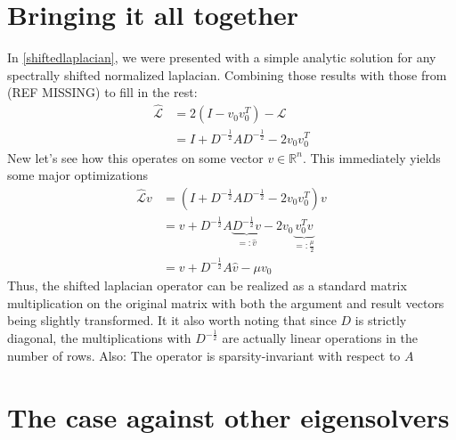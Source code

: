 \documentclass[10pt, a4paper, twocolumn]{article} %
\begin{document}
\section{Bringing it all together}
In \eqref{shiftedlaplacian}, we were presented with a simple analytic solution for any spectrally shifted normalized laplacian.
Combining those results with those from (REF MISSING) to fill in the rest:
\begin{equation}
	\begin{split}
		\hat{\mathcal{L}} & = 2 ( I - v_0 v_0^T ) - \mathcal{L}\\
		& = I + D^{-\frac{1}{2}} A D^{-\frac{1}{2}} - 2 v_0 v_0^T
	\end{split}
\end{equation}
New let's see how this operates on some vector $v \in \mathbb{R}^n$. This immediately yields some major optimizations
\begin{equation}
	\begin{split}
		\hat{\mathcal{L}}v & = \left( I + D^{-\frac{1}{2}} A D^{-\frac{1}{2}} - 2 v_0 v_0^T\right) v\\
		& = v + D^{-\frac{1}{2}} A \underbrace{D^{-\frac{1}{2}} v}_{=:\hat{v}} - 2 v_0 \underbrace{v_0^T v}_{=:\frac{\mu}{2}}\\
		& = v + D^{-\frac{1}{2}} A \hat{v} - \mu v_0
	\end{split}
\end{equation}
Thus, the shifted laplacian operator can be realized as a standard matrix multiplication on the original matrix with both the
argument and result vectors being slightly transformed. It it also worth noting that since $D$ is strictly diagonal, the multiplications with $D^{-\frac{1}{2}}$
are actually linear operations in the number of rows. Also: The operator is sparsity-invariant with respect to $A$


\section{The case against other eigensolvers}


\printbibliography[title={Bibliography}] %

\end{document}

